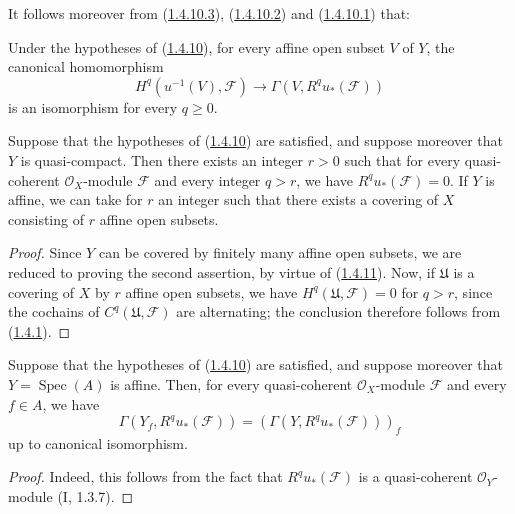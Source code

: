 It follows moreover from (\hyperref[III.1.4.10.3]{1.4.10.3}),
(\hyperref[III.1.4.10.2]{1.4.10.2}) and
(\hyperref[III.1.4.10.1]{1.4.10.1}) that:

\begin{corollary}[1.4.11]
\label{III.1.4.11}
Under the hypotheses of (\hyperref[III.1.4.10]{1.4.10}), for every
affine open subset $V$ of $Y$, the canonical homomorphism
\begin{equation}
\label{III.1.4.11.1}
\tag{1.4.11.1}
H^q(u^{-1}(V),\mathcal F)\longrightarrow
\Gamma(V,R^qu_*(\mathcal F))
\end{equation}
is an isomorphism for every $q\geq0$.
\end{corollary}

\begin{corollary}[1.4.12]
\label{III.1.4.12}
Suppose that the hypotheses of
(\hyperref[III.1.4.10]{1.4.10}) are satisfied, and suppose moreover that
$Y$ is quasi-compact. Then there exists an integer $r>0$ such that for every
quasi-coherent $\mathcal O_X$-module $\mathcal F$ and every integer $q>r$,
we have $R^qu_*(\mathcal F)=0$. If $Y$ is affine, we can take for $r$ an
integer such that there exists a covering of $X$ consisting of $r$ affine
open subsets.
\end{corollary}

\begin{proof}
Since $Y$ can be covered by finitely many affine open subsets, we are
reduced to proving the second assertion, by virtue of
(\hyperref[III.1.4.11]{1.4.11}). Now, if $\mathfrak U$ is a
covering of $X$ by $r$ affine open subsets, we have
$H^q(\mathfrak U,\mathcal F)=0$ for $q>r$, since the cochains of
$C^q(\mathfrak U,\mathcal F)$ are alternating; the conclusion therefore
follows from (\hyperref[III.1.4.1]{1.4.1}).
\end{proof}

\begin{corollary}[1.4.13]
\label{III.1.4.13}
Suppose that the hypotheses of
(\hyperref[III.1.4.10]{1.4.10}) are satisfied, and suppose moreover that
$Y=\operatorname{Spec}(A)$ is affine. Then, for every quasi-coherent
$\mathcal O_X$-module $\mathcal F$ and every $f\in A$, we have
\[
\Gamma(Y_f,R^qu_*(\mathcal F))
=(\Gamma(Y,R^qu_*(\mathcal F)))_f
\]
up to canonical isomorphism.
\end{corollary}

\begin{proof}
Indeed, this follows from the fact that $R^qu_*(\mathcal F)$ is a
quasi-coherent $\mathcal O_Y$-module (I, 1.3.7).
\end{proof}

